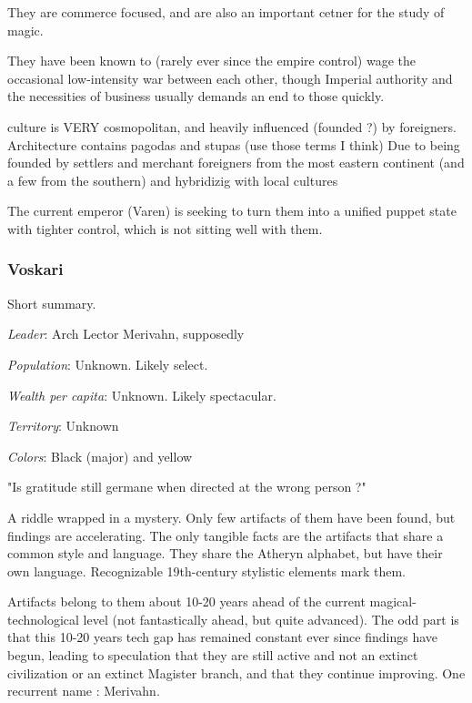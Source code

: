 They are commerce focused, and are also an important cetner for the study of magic.

They have been known to (rarely ever since the empire control) wage the occasional low-intensity war between each other, though Imperial authority and the necessities of business usually demands an end to those quickly.

culture is  VERY cosmopolitan, and heavily influenced (founded ?) by foreigners. Architecture contains pagodas and stupas (use those terms I think) Due to being founded by settlers and merchant foreigners from the most eastern continent (and a few from the southern) and hybridizig with local cultures


The current emperor (Varen) is seeking to turn them into a unified puppet state with tighter control, which is not sitting well with them.

	

\subsubsection{Voskari}

Short summary.


\textit{Leader}: Arch Lector Merivahn, supposedly

\textit{Population}: Unknown. Likely select.

\textit{Wealth per capita}: Unknown. Likely spectacular.

\textit{Territory}: Unknown
    
\textit{Colors}: Black (major) and yellow


\begin{rpg-quotebox}
	"Is gratitude still germane when directed at the wrong person ?"
\end{rpg-quotebox}

A riddle wrapped in a mystery. Only few artifacts of them have been found, but findings are accelerating. The only tangible facts are the artifacts that share a common style and language. They share the Atheryn alphabet, but have their own language. Recognizable 19th-century stylistic elements mark them.

Artifacts belong to them about 10-20 years ahead of the current magical-technological level (not fantastically ahead, but quite advanced). The odd part is that this 10-20 years tech gap has remained constant ever since findings have begun, leading to speculation that they are still active and not an extinct civilization or an extinct Magister branch, and that they continue improving. One recurrent name : Merivahn.



